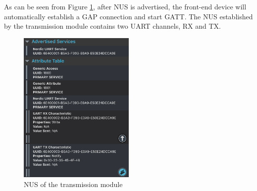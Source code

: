 As can be seen from Figure \ref{fig:nus}, after NUS is advertised, the front-end device will automatically establish a GAP connection and start GATT. The NUS established by the transmission module contains two UART channels, RX and TX.
\begin{figure}[H]
    \centering
    \includegraphics[width=0.5\textwidth]{figure/nus.png}
    \caption{NUS of the transmission module}
    \label{fig:nus}
\end{figure}

